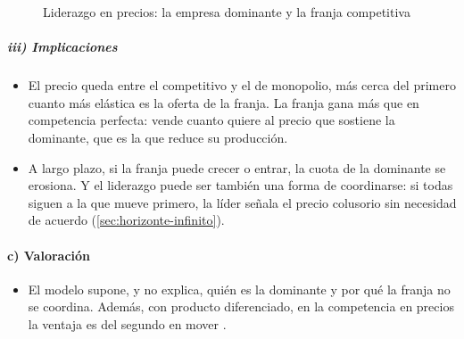 \documentclass[11pt]{article}
\begin{document}
\begin{figure}[H]
\centering
\caption{Liderazgo en precios: la empresa dominante y la franja competitiva}\label{fig:liderazgo}
\end{figure}

\subparagraph{iii) Implicaciones}

\begin{itemize}
\item El precio queda entre el competitivo y el de monopolio, más cerca del primero cuanto más elástica es la oferta de la franja. La franja gana más que en competencia perfecta: vende cuanto quiere al precio que sostiene la dominante, que es la que reduce su producción.
\item A largo plazo, si la franja puede crecer o entrar, la cuota de la dominante se erosiona. Y el liderazgo puede ser también una forma de coordinarse: si todas siguen a la que mueve primero, la líder señala el precio colusorio sin necesidad de acuerdo (\ref{sec:horizonte-infinito}).
\end{itemize}

\paragraph{c) Valoración}

\begin{itemize}
\item El modelo supone, y no explica, quién es la dominante y por qué la franja no se coordina. Además, con producto diferenciado, en la competencia en precios la ventaja es del segundo en mover\nocite{GalOr1985First} .
\end{itemize}
\end{document}
